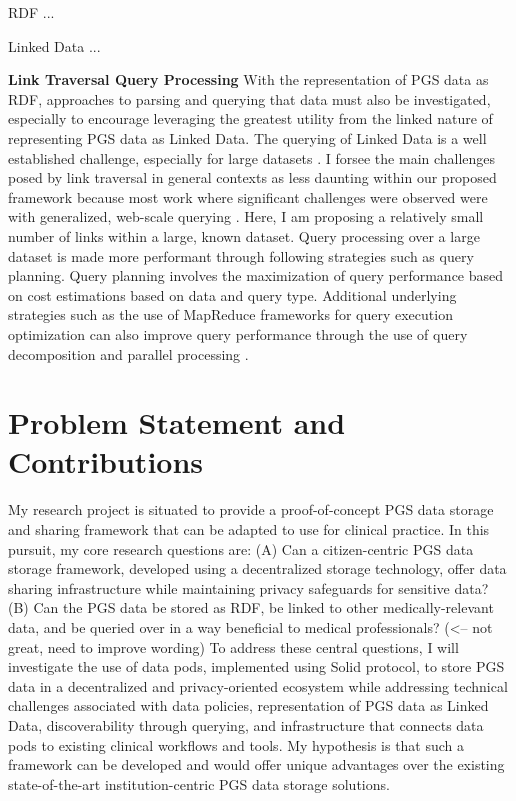 \documentclass[runningheads]{llncs}
\begin{document}
RDF ...

Linked Data ...

\textbf{Link Traversal Query Processing}
With the representation of PGS data as RDF, approaches to parsing and querying that data must also be investigated, especially to encourage leveraging the greatest utility from the linked nature of representing PGS data as Linked Data.
The querying of Linked Data is a well established challenge, especially for large datasets \cite{taelman_evaluation_2023}.
I forsee the main challenges posed by link traversal in general contexts as less daunting within our proposed framework because most work where significant challenges were observed were with generalized, web-scale querying \cite{taelman_evaluation_2023}. 
Here, I am proposing a relatively small number of links within a large, known dataset. 
Query processing over a large dataset is made more performant through following strategies such as query planning.
Query planning involves the maximization of query performance based on cost estimations based on data and query type. 
Additional underlying strategies such as the use of MapReduce frameworks for query execution optimization can also improve query performance through the use of query decomposition and parallel processing \cite{shim_mapreduce_2013}.  


\section{Problem Statement and Contributions}

My research project is situated to provide a proof-of-concept PGS data storage and sharing framework that can be adapted to use for clinical practice. In this pursuit, my core research questions are: 
(A) Can a citizen-centric PGS data storage framework, developed using a decentralized storage technology, offer data sharing infrastructure while maintaining privacy safeguards for sensitive data? 
(B) Can the PGS data be stored as RDF, be linked to other medically-relevant data, and be queried over in a way beneficial to medical professionals? (<-- not great, need to improve wording)
To address these central questions, I will investigate the use of data pods, implemented using Solid protocol, to store PGS data in a decentralized and privacy-oriented ecosystem while addressing technical challenges associated with data policies, representation of PGS data as Linked Data, discoverability through querying, and infrastructure that connects data pods to existing clinical workflows and tools. 
My hypothesis is that such a framework can be developed and would offer unique advantages over the existing state-of-the-art institution-centric PGS data storage solutions. 
\end{document}

